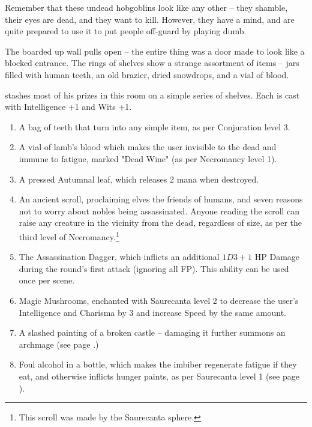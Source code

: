 \begin{multicols}{2}

Remember that these undead hobgoblins look like any other -- they shamble, their eyes are dead, and they want to kill.
However, they have a mind, and are quite prepared to use it to put people off-guard by playing dumb.



\begin{boxtext}

	The boarded up wall pulls open -- the entire thing was a door made to look like a blocked entrance.  The rings of shelves show a strange assortment of items -- jars filled with human teeth, an old brazier, dried snowdrops, and a vial of blood.

\end{boxtext}

 stashes most of his prizes in this room on a simple series of shelves.  Each is cast with Intelligence +1 and Wits +1.

\begin{enumerate}

	\item{A bag of teeth that turn into any simple item, as per Conjuration level 3.}
	\item{A vial of lamb's blood which makes the user invisible to the dead and immune to fatigue, marked "Dead Wine" (as per Necromancy level 1).}
	\item{A pressed Autumnal leaf, which releases 2 mana when destroyed.}
	\item{An ancient scroll, proclaiming elves the friends of humans, and seven reasons not to worry about nobles being assassinated.  Anyone reading the scroll can raise any creature in the vicinity from the dead, regardless of size, as per the third level of Necromancy.\footnote{This scroll was made by the Saurecanta sphere.}}
	\item{The Assassination Dagger, which inflicts an additional $1D3+1$ HP Damage during the round's first attack (ignoring all FP).  This ability can be used once per scene.}
	\item{Magic Mushrooms, enchanted with Saurecanta level 2 to decrease the user's Intelligence and Charisma by 3 and increase Speed by the same amount.}
	\item{A slashed painting of a broken castle -- damaging it further summons an archmage (see page \pageref{archmage}.)}
	\item{Foul alcohol in a bottle, which makes the imbiber regenerate fatigue if they eat, and otherwise inflicts hunger paints, as per Saurecanta level 1 (see page \pageref{saurecantaone}).}
\end{enumerate}


\end{multicols}
